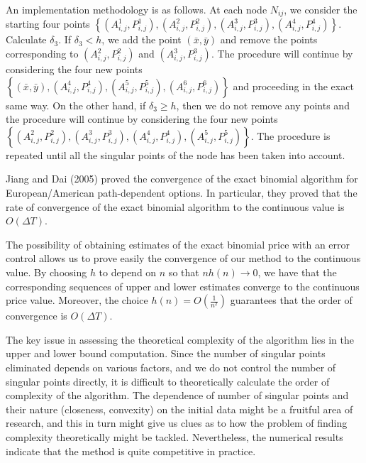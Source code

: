 An implementation methodology is as follows. At each node $ N_{ij} $, we consider the starting four points $ \left\lbrace  \left( A_{i,j}^1, P_{i,j}^1 \right), \left( A_{i,j}^2, P_{i,j}^2 \right), \left( A_{i,j}^3, P_{i,j}^3 \right), \left( A_{i,j}^4, P_{i,j}^4 \right)  \right\rbrace $. Calculate $ \delta_3 $. If $ \delta_3 < h $, we add the point $ (\bar{x}, \bar{y}) $ and remove the points corresponding to $ \left( A_{i,j}^2, P_{i,j}^2 \right) $ and $ \left( A_{i,j}^3, P_{i,j}^3 \right) $. The procedure will continue by considering the four new points $ \left\lbrace  (\bar{x}, \bar{y}), \left( A_{i,j}^4, P_{i,j}^4 \right), \left( A_{i,j}^5, P_{i,j}^5 \right), \left( A_{i,j}^6, P_{i,j}^6 \right)  \right\rbrace $ and proceeding in the exact same way. On the other hand, if $ \delta_3 \ge h $, then we do not remove any points and the procedure will continue by considering the four new points $ \left\lbrace  \left( A_{i,j}^2, P_{i,j}^2 \right), \left( A_{i,j}^3, P_{i,j}^3 \right), \left( A_{i,j}^4, P_{i,j}^4 \right), \left( A_{i,j}^5, P_{i,j}^5 \right)  \right\rbrace $. The procedure is repeated until all the singular points of the node has been taken into account.

\begin{rem}
	Jiang and Dai (2005) \cite{Jiang2004} proved the convergence of the exact binomial algorithm for European/American path-dependent options. In particular, they proved that the rate of convergence of the exact binomial algorithm to the continuous value is $ O( \Delta T ) $.
\end{rem}

The possibility of obtaining estimates of the exact binomial price with an error control allows us to prove easily the convergence of our method to the continuous value. By choosing $ h $ to depend on $ n $ so that $ n h(n) \to 0 $, we have that the corresponding sequences of upper and lower estimates converge to the continuous price value. Moreover, the choice $ h(n) = O(\frac{1}{n^2}) $ guarantees that the order of convergence is $ O( \Delta T ) $.

\begin{rem}
	The key issue in assessing the theoretical complexity of the algorithm lies in the upper and lower bound computation. Since the number of singular points eliminated depends on various factors, and we do not control the number of singular points directly, it is difficult to theoretically calculate the order of complexity of the algorithm. The dependence of number of singular points and their nature (closeness, convexity) on the initial data might be a fruitful area of research, and this in turn might give us clues as to how the problem of finding complexity theoretically might be tackled. Nevertheless, the numerical results indicate that the method is quite competitive in practice.
\end{rem}



